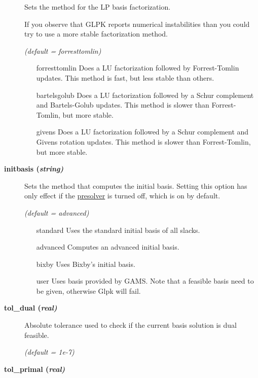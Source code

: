 \begin{description}
Sets the method for the LP basis factorization.

If you observe that GLPK reports numerical instabilities than you could try to use a more stable factorization method.

\textsl{(default = forresttomlin)}
\begin{itemize}
\item[forresttomlin] 
Does a LU factorization followed by Forrest-Tomlin updates.
This method is fast, but less stable than others.
\item[bartelsgolub] 
Does a LU factorization followed by a Schur complement and Bartels-Golub updates.
This method is slower than Forrest-Tomlin, but more stable.
\item[givens] 
Does a LU factorization followed by a Schur complement and Givens rotation updates.
This method is slower than Forrest-Tomlin, but more stable.
\end{itemize}

\item[\label{initbasis}\hypertarget{initbasis}
{\textbf{initbasis (\slshape{string})}}]\hspace{1.0in}

Sets the method that computes the initial basis.
Setting this option has only effect if the \hyperlink{presolve}{presolver} is turned off, which is on by default.

\textsl{(default = advanced)}
\begin{itemize}
\item[standard] 
Uses the standard initial basis of all slacks.
\item[advanced] 
Computes an advanced initial basis.
\item[bixby] 
Uses Bixby's initial basis.
\item[user] 
Uses basis provided by GAMS.
Note that a feasible basis need to be given, otherwise Glpk will fail.
\end{itemize}

\item[\label{glpktol_dual}\hypertarget{glpktol_dual}
{\textbf{tol\_dual (\slshape{real})}}]\hspace{1.0in}

Absolute tolerance used to check if the current basis solution is dual feasible.

\textsl{(default = 1e-7)}

\item[\label{glpktol_primal}\hypertarget{glpktol_primal}
{\textbf{tol\_primal (\slshape{real})}}]\hspace{1.0in}


\end{description}
